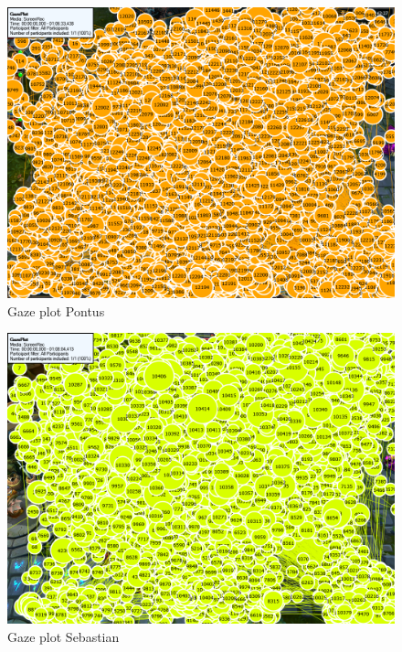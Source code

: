 \documentclass{article}
\begin{document}
\begin{figure}[h!]
\begin{center}
\includegraphics*[width=0.90\columnwidth]{images/gazeplot/Pontus}
\end{center}
\caption{Gaze plot Pontus}
\label{gaze_pon}
\end{figure}

\begin{figure}[h!]
\begin{center}
\includegraphics*[width=0.90\columnwidth]{images/gazeplot/Sebastian}
\end{center}
\caption{Gaze plot Sebastian}
\label{gaze_seb}
\end{figure}
\end{document}

